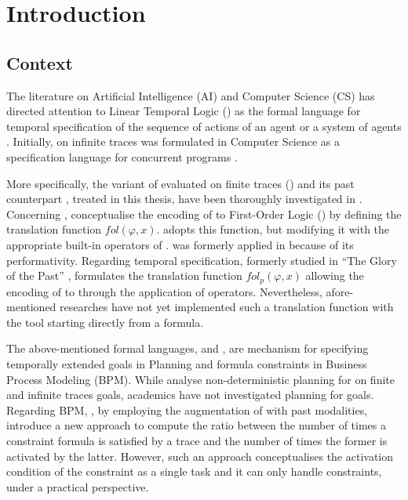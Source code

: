 \chapter{Introduction}
\section{Context}
The literature on Artificial Intelligence (AI) and Computer Science (CS) has directed attention to Linear Temporal Logic (\LTL) as the formal language for temporal specification of the sequence of actions of an agent or a system of agents \citep{fagin2004reasoning}. Initially, \LTL on infinite traces was formulated in Computer Science as a specification language for concurrent programs \citep{Pnueli:1977:TLP:1382431.1382534}.

More specifically, the variant of \LTL evaluated on finite traces (\LTLf) and its past counterpart \PLTL, treated in this thesis, have been thoroughly investigated in \cite{de2013linear,lichtenstein1985glory}. Concerning \LTLf, \cite{de2013linear} conceptualise the encoding of \LTLf to First-Order Logic (\FOL) by defining the translation function $fol(\varphi, x)$. \cite{zpv2018} adopts this function, but modifying it with the appropriate built-in operators of \MONA. \MONA was formerly applied in \cite{zhu2017symbolic} because of its performativity. Regarding \PLTL temporal specification, formerly studied in ``The Glory of the Past'' \citep{lichtenstein1985glory}, \cite{zpv2018} formulates the translation function $fol_p(\varphi, x)$ allowing the encoding of \PLTL to \FOL through the application of \MONA operators. Nevertheless, afore-mentioned researches have not yet implemented such a translation function with the \MONA tool starting directly from a \PLTL formula. 

The above-mentioned formal languages, \LTLf and \PLTL, are mechanism for specifying temporally extended goals in Planning and formula constraints in Business Process Modeling (BPM). While \cite{camacho2017non} analyse non-deterministic planning for \LTL on finite and infinite traces goals, academics have not investigated planning for \PLTL goals. Regarding BPM, \cite{cecconi2018interestingness}, by employing the augmentation of \LTLf with past modalities, introduce a new approach to compute the ratio between the number of times a constraint formula is satisfied by a trace and the number of times the former is activated by the latter. However, such an approach conceptualises the activation condition of the constraint as a single task and it can only handle \declare constraints, under a practical perspective.

